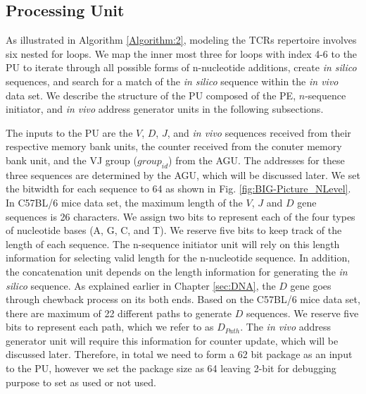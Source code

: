 \subsection{Processing Unit}\label{subsec:processing unit}

As illustrated in Algorithm \ref{Algorithm:2}, modeling the TCRs repertoire involves six nested for loops. We map the inner most three for loops with index 4-6 to the PU to iterate through all possible forms of n-nucleotide additions, create \emph{in silico} sequences, and search for a match of the \emph{in silico} sequence within the \emph{in vivo} data set. We describe the structure of the PU composed of the PE, $n$-sequence initiator, and \emph{in vivo} address generator units in the following subsections.

The inputs to the PU are the $V$, $D$, $J$, and \emph{in vivo} sequences received from their respective memory bank units, the counter received from the conuter memory bank unit, and the VJ group ($group_{id}$) from the AGU. The addresses for these three sequences are determined by the AGU, which will be discussed later. We set the bitwidth for each sequence to 64 as shown in Fig. \ref{fig:BIG-Picture_NLevel}. In C57BL/6 mice data set, the maximum length of the  $V$, $J$ and $D$ gene sequences is 26 characters. We assign two bits to represent each of the four types of nucleotide bases (A, G, C, and T). We reserve five bits to keep track of the length of each sequence. The n-sequence initiator unit will rely on this length information for selecting valid length for the n-nucleotide sequence. In addition, the concatenation unit depends on the length information for generating the \emph{in silico} sequence. As explained earlier in Chapter \ref{sec:DNA}, the $D$ gene goes through chewback process on its both ends. Based on the C57BL/6 mice data set, there are maximum of 22 different paths to generate $D$ sequences. We reserve five bits to represent each path, which we refer to as $D_{Path}$. The \emph{in vivo} address generator unit will require this information for counter update, which will be discussed later. Therefore, in total we need to form a 62 bit package as an input to the PU, however we set the package size as 64 leaving 2-bit  for debugging purpose to set as used or not used.  
 
